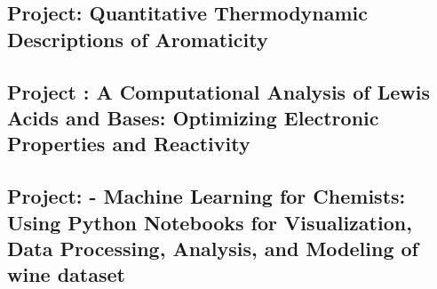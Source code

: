 \documentclass[12pt]{article}
\newcommand{\rom}[1]{\uppercase\expandafter{\romannumeral #1\relax}}
\begin{document}

\newpage

\newpage

\newpage
\tableofcontents
\newpage


\newpage
{} 


\vspace*{\fill}
\begin{center}
    \section*{Project: Quantitative Thermodynamic Descriptions of Aromaticity}\cite{quantitative_thermodynamic_aromaticity_2005}
    \label{project1}
\end{center}
\vspace*{\fill}

\newpage


\newpage
\vspace*{\fill}
\begin{center}
    \section*{Project : A Computational Analysis of Lewis Acids and Bases: Optimizing Electronic Properties and Reactivity}\cite{anderson_lewis_acid_base_2000}
    \label{project2section}
\end{center}
\vspace*{\fill}

\newpage


\newpage
\vspace*{\fill}
\begin{center}
    \section*{Project: \rom{3} - Machine Learning for Chemists: Using Python Notebooks for Visualization, Data Processing, Analysis, and Modeling of wine dataset}\cite{lafuente_gentle_ml_2021}
\end{center}
\vspace*{\fill}
\end{document}
